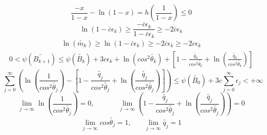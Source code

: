 \documentclass[12pt]{article}
\newcommand{\bea}{\begin{eqnarray}}
\newcommand{\eea}{\end{eqnarray}}
\begin{document}
\[
\frac{-x}{1-x}-\ln(1-x)=h\left(\frac{1}{1-x}\right)\leq 0
\]
\[
\ln(1-\bar{c}\epsilon_k) \geq \frac{-\bar{c}\epsilon_k}{1-\bar{c}\epsilon_k} \geq -2\bar{c}\epsilon_k
\]
\bea \label{6.59}
\ln( \tilde{m_k} )\geq \ln(1-\bar{c}\epsilon_k) \geq -2\bar{c}\epsilon_k \geq -2c\epsilon_k
\eea
\bea \label{6.60}
0<\psi(\tilde{B_{k+1}}) \leq \psi(\tilde{B_{k}}) + 3c\epsilon_k + \ln(cos^2\tilde{\theta_k} )+ \left[ 1- \frac{\tilde{q_k}}{cos^2\tilde{\theta_k}} + \ln\left(\frac{\tilde{q_k}}{cos^2\tilde{\theta_k}}\right) \right]
\eea
\[
\sum\limits_{j=0}^\infty \left(\ln\left(\frac{1}{cos^2\tilde{\theta_j}}\right) - \left[ 1- \frac{\tilde{q_j}}{cos^2\tilde{\theta_j}} + \ln\left(\frac{\tilde{q_j}}{cos^2\tilde{\theta_j}}\right) \right]\right) \leq \psi(\tilde{B_0})+3c\sum\limits_{j=0}^\infty \epsilon_j < +\infty
\]
\[
\lim_{j\to\infty} \ln\left( \frac{1}{cos^2\tilde{\theta_j}}\right)=0, \ \ \ \ \ \ \ \ \ \ \ \ \ \ \ 
\lim_{j\to\infty} \left( 1- \frac{\tilde{q_j}}{cos^2\tilde{\theta_j}} + \ln\left(\frac{\tilde{q_j}}{cos^2\tilde{\theta_j}} \right)\right) = 0
\]
\bea \label{6.61}
\lim_{j\to\infty} cos\tilde{\theta_j}=1,  \ \ \ \ \ \ \ \ 
\lim_{j\to\infty} \tilde{q_j}=1
\eea



 
\end{document}
